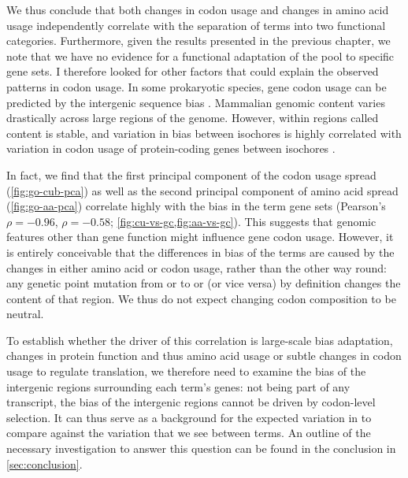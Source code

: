 We thus conclude that both changes in codon usage and changes in amino acid
usage independently correlate with the separation of \go terms into two
functional categories. Furthermore, given the results presented in the previous
chapter, we note that we have no evidence for a functional adaptation of the
\trna pool to specific gene sets. I therefore looked for other factors that
could explain the observed patterns in codon usage. In some prokaryotic species,
gene codon usage can be predicted by the intergenic sequence \gc bias
\citep{Chen:2004}. Mammalian genomic \gc content varies drastically across large
regions of the genome. However, within regions called  \gc
content is stable, and variation in \gc bias between isochores is highly
correlated with variation in codon usage of protein-coding genes between
isochores \citep{Sharp:1994}.

In fact, we find that the first principal component of the codon usage spread
(\cref{fig:go-cub-pca}) as well as the second principal component of amino acid
spread (\cref{fig:go-aa-pca}) correlate highly with the \gc bias in the \go term
gene sets (Pearson’s \(\rho = -0.96\), \(\rho = -0.58\);
\cref{fig:cu-vs-gc,fig:aa-vs-gc}). This suggests that genomic features other
than gene function might influence gene codon usage. However, it is entirely
conceivable that the differences in \gc bias of the \go terms are caused by the
changes in either amino acid or codon usage, rather than the other way round:
any genetic point mutation from \nA or \nT to \nC or \nG (or vice versa) by
definition changes the \gc content of that region. We thus do not expect
changing codon composition to be \gc neutral.

To establish whether the driver of this correlation is large-scale \gc bias
adaptation, changes in protein function and thus amino acid usage or subtle
changes in codon usage to regulate translation, we therefore need to examine the
\gc bias of the intergenic regions surrounding each \go term’s genes: not being
part of any \mrna transcript, the \gc bias of the intergenic regions cannot be
driven by codon-level selection. It can thus serve as a background for the
expected variation in \gc to compare against the \gc variation that we see
between \go terms. An outline of the necessary investigation to answer this
question can be found in the conclusion in \cref{sec:conclusion}.


